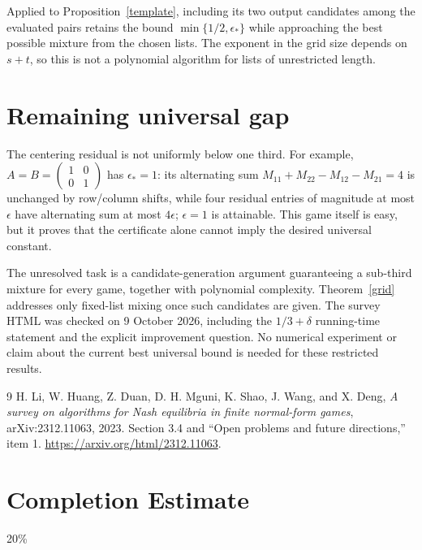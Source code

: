 \documentclass[11pt]{article}
\theoremstyle{definition}
\begin{document}
Applied to Proposition~\ref{template}, including its two output candidates
among the evaluated pairs retains the bound $\min\{1/2,\epsilon_*\}$
while approaching the best possible mixture from the chosen lists.
The exponent in the grid size depends on $s+t$, so this is not a polynomial
algorithm for lists of unrestricted length.

\section{Remaining universal gap}
The centering residual is not uniformly below one third. For example,
$A=B=\left(\begin{smallmatrix}1&0\\0&1\end{smallmatrix}\right)$ has
$\epsilon_*=1$: its alternating sum
$M_{11}+M_{22}-M_{12}-M_{21}=4$ is unchanged by row/column shifts, while
four residual entries of magnitude at most $\epsilon$ have alternating
sum at most $4\epsilon$; $\epsilon=1$ is attainable. This game itself
is easy, but it proves that the certificate alone cannot imply the
desired universal constant.

The unresolved task is a candidate-generation argument guaranteeing a
sub-third mixture for every game, together with polynomial complexity.
Theorem~\ref{grid} addresses only fixed-list mixing once such candidates
are given. The survey HTML was checked on 9 October 2026, including the
$1/3+\delta$ running-time statement and the explicit improvement question.
No numerical experiment or claim about the current best universal bound
is needed for these restricted results.
\begin{thebibliography}{9}
 H. Li, W. Huang, Z. Duan, D. H. Mguni, K. Shao,
J. Wang, and X. Deng, \emph{A survey on algorithms for Nash equilibria
in finite normal-form games}, arXiv:2312.11063, 2023.
Section 3.4 and ``Open problems and future directions,'' item 1.
\url{https://arxiv.org/html/2312.11063}.
\end{thebibliography}

\section{Completion Estimate}
20\%
\end{document}
